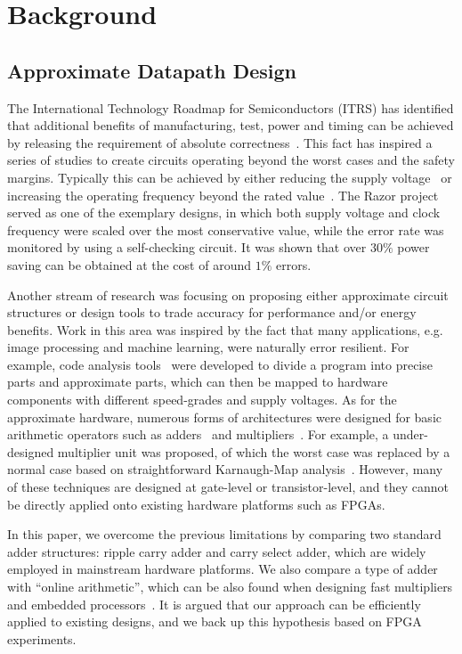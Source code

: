 \documentclass[10pt, conference, compsocconf]{IEEEtran}
\begin{document}
\section{Background}\label{sec:Background}
\subsection{Approximate Datapath Design}
The International Technology Roadmap for Semiconductors (ITRS) has identified that additional benefits of manufacturing, test, power and timing can be achieved by releasing the requirement of absolute correctness~\cite{semiconductor2007international}. This fact has inspired a series of studies to create circuits operating beyond the worst cases and the safety margins. Typically this can be achieved by either reducing the supply voltage~\cite{NonUniformScaling} or increasing the operating frequency beyond the rated value~\cite{SKfccm13,JoshFCCM2012}. The Razor project~\cite{Razor2004} served as one of the exemplary designs, in which both supply voltage and clock frequency were scaled over the most conservative value, while the error rate was monitored by using a self-checking circuit. It was shown that over $30\%$ power saving can be obtained at the cost of around $1\%$ errors.

Another stream of research was focusing on proposing either approximate circuit structures or design tools to trade accuracy for performance and/or energy benefits. Work in this area was inspired by the fact that many applications, e.g. image processing and machine learning, were naturally error resilient. For example, code analysis tools~\cite{Truffle2012Uwash,EnerJ2011Uwash} were developed to divide a program into precise parts and approximate parts, which can then be mapped to hardware components with different speed-grades and supply voltages. As for the approximate hardware, numerous forms of architectures were designed for basic arithmetic operators such as adders~\cite{ApproximateAdderTC} and multipliers~\cite{ApproximateMultDATE}. For example, a under-designed multiplier unit was proposed, of which the worst case was replaced by a normal case based on straightforward Karnaugh-Map analysis~\cite{Undersigned2x2multiplier}. However, many of these techniques are designed at gate-level or transistor-level, and they cannot be directly applied onto existing hardware platforms such as FPGAs.

In this paper, we overcome the previous limitations by comparing two standard adder structures: ripple carry adder and carry select adder, which are widely employed in mainstream hardware platforms. We also compare a type of adder with ``online arithmetic'', which can be also found when designing fast multipliers and embedded processors~\cite{RedundantMult_1987}. It is argued that our approach can be efficiently applied to existing designs, and we back up this hypothesis based on FPGA experiments. 
\end{document}
